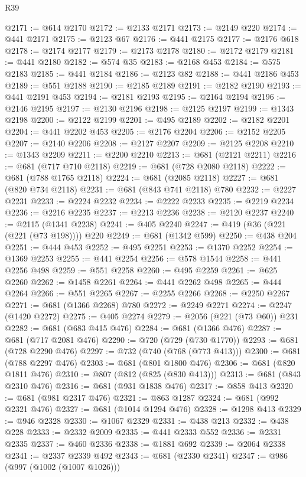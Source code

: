 \begin{lexlean}{R39}
\begin{coremodule}
@2171 := @614 @2170
@2172 := @2133 @2171
@2173 := @2149 @220
@2174 := @441 @2171
@2175 := @2123 @67
@2176 := @441 @2175
@2177 := @2176 @618
@2178 := @2174 @2177
@2179 := @2173 @2178
@2180 := @2172 @2179
@2181 := @441 @2180
@2182 := @574 @35
@2183 := @2168 @453
@2184 := @575 @2183
@2185 := @441 @2184
@2186 := @2123 @82
@2188 := @441 @2186 @453
@2189 := @551 @2188
@2190 := @2185 @2189
@2191 := @2182 @2190
@2193 := @441 @2191 @453
@2194 := @2181 @2193
@2195 := @2164 @2194
@2196 := @2146 @2195
@2197 := @2130 @2196
@2198 := @2125 @2197
@2199 := @1343 @2198
@2200 := @2122 @2199
@2201 := @495 @2189
@2202 := @2182 @2201
@2204 := @441 @2202 @453
@2205 := @2176 @2204
@2206 := @2152 @2205
@2207 := @2140 @2206
@2208 := @2127 @2207
@2209 := @2125 @2208
@2210 := @1343 @2209
@2211 := @2200 @2210
@2213 := @681 (@2121 @2211)
@2216 := @681 (@717 @710 @2118)
@2219 := @681 (@728 @2080 @2118)
@2222 := @681 (@788 @1765 @2118)
@2224 := @681 (@2085 @2118)
@2227 := @681 (@820 @734 @2118)
@2231 := @681 (@843 @741 @2118) @780
@2232 := @2227 @2231
@2233 := @2224 @2232
@2234 := @2222 @2233
@2235 := @2219 @2234
@2236 := @2216 @2235
@2237 := @2213 @2236
@2238 := @2120 @2237
@2240 := @2115 (@1341 @2238)
@2241 := @405 @2240
@2247 := @419 (@36 (@221 (@221 (@73 @198)))) @220
@2249 := @681 (@1342 @599)
@2250 := @438 @204
@2251 := @444 @453
@2252 := @495 @2251
@2253 := @1370 @2252
@2254 := @1369 @2253
@2255 := @441 @2254
@2256 := @578 @1544
@2258 := @441 @2256 @498
@2259 := @551 @2258
@2260 := @495 @2259
@2261 := @625 @2260
@2262 := @1458 @2261
@2264 := @441 @2262 @498
@2265 := @444 @2264
@2266 := @551 @2265
@2267 := @2255 @2266
@2268 := @2250 @2267
@2271 := @681 (@1366 @2268) @780
@2272 := @2249 @2271
@2274 := @2247 (@1420 @2272)
@2275 := @405 @2274
@2279 := @2056 (@221 (@73 @60)) @231
@2282 := @681 (@683 @415 @476)
@2284 := @681 (@1366 @476)
@2287 := @681 (@717 @2081 @476)
@2290 := @720 (@729 (@730 @1770))
@2293 := @681 (@728 @2290 @476)
@2297 := @732 (@740 (@768 (@773 @413)))
@2300 := @681 (@788 @2297 @476)
@2303 := @681 (@801 @1800 @476)
@2306 := @681 (@820 @1811 @476)
@2310 := @807 (@812 (@825 (@830 @413)))
@2313 := @681 (@843 @2310 @476)
@2316 := @681 (@931 @1838 @476)
@2317 := @858 @413
@2320 := @681 (@981 @2317 @476)
@2321 := @863 @1287
@2324 := @681 (@992 @2321 @476)
@2327 := @681 (@1014 @1294 @476)
@2328 := @1298 @413
@2329 := @946 @2328
@2330 := @1067 @2329
@2331 := @438 @213
@2332 := @438 @228
@2333 := @2332 @2009
@2335 := @441 @2333 @552
@2336 := @2331 @2335
@2337 := @460 @2336
@2338 := @1881 @692
@2339 := @2064 @2338
@2341 := @2337 @2339 @492
@2343 := @681 (@2330 @2341)
@2347 := @986 (@997 (@1002 (@1007 @1026)))

\end{coremodule}
\end{lexlean}
